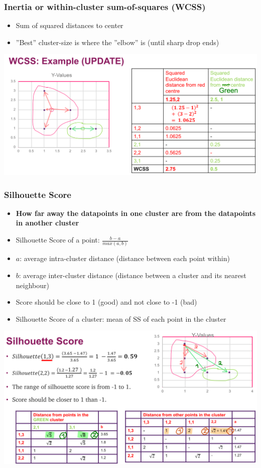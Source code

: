\subsubsection{Inertia or within-cluster sum-of-squares (WCSS)}
\begin{itemize}
    \item Sum of squared distances to center
    \item ''Best'' cluster-size is where the ''elbow'' is (until sharp drop ends)
\end{itemize}
\includegraphics[width=\linewidth]{./img/w12_wcss.png}

\subsubsection{Silhouette Score}
\begin{itemize}
    \item \textbf{How far away the datapoints in one cluster are from the datapoints in another cluster}
    \item Silhouette Score of a point: $\frac{b-a}{max(a,b)}$
    \item $a$: average intra-cluster distance (distance between each point within)
    \item $b$: average inter-cluster distance (distance between a cluster and its nearest neighbour)
    \item Score should be close to 1 (good) and not close to -1 (bad)
    \item Silhouette Score of a cluster: mean of SS of each point in the cluster
\end{itemize}
\includegraphics[width=\linewidth]{./img/w12_silhouette_score.png}


